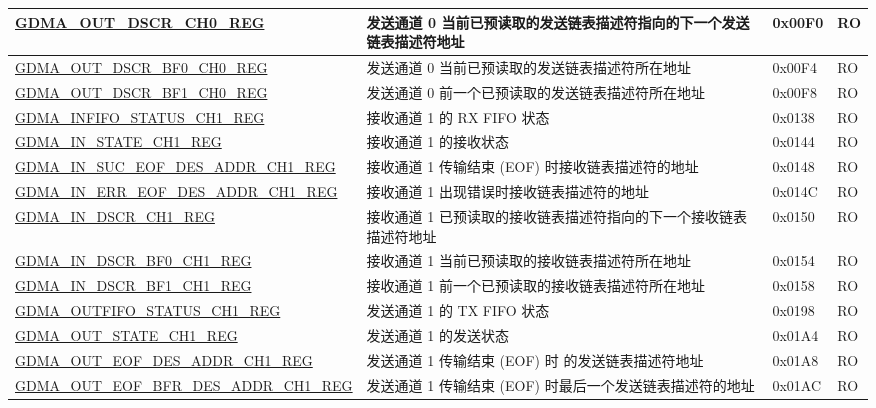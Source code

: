 \begin{longtable}{ | p{6cm} | p{7.2cm} | p{1.3cm} | p{1cm} | }
\hyperref[regdesc:GDMAOUTDSCRCHNREG]{GDMA\_OUT\_DSCR\_CH0\_REG} & 发送通道 0 当前已预读取的发送链表描述符指向的下一个发送链表描述符地址 & 0x00F0 & RO \\ \hline
\hyperref[regdesc:GDMAOUTDSCRBF0CHNREG]{GDMA\_OUT\_DSCR\_BF0\_CH0\_REG} &  发送通道 0 当前已预读取的发送链表描述符所在地址 & 0x00F4 & RO \\ \hline
\hyperref[regdesc:GDMAOUTDSCRBF1CHNREG]{GDMA\_OUT\_DSCR\_BF1\_CH0\_REG} & 发送通道 0 前一个已预读取的发送链表描述符所在地址 & 0x00F8 & RO \\ \hline
\hyperref[regdesc:GDMAINFIFOSTATUSCHNREG]{GDMA\_INFIFO\_STATUS\_CH1\_REG} & 接收通道 1 的 RX FIFO 状态 & 0x0138 & RO \\ \hline
\hyperref[regdesc:GDMAINSTATECHNREG]{GDMA\_IN\_STATE\_CH1\_REG} & 接收通道 1 的接收状态 & 0x0144 & RO \\ \hline
\hyperref[regdesc:GDMAINSUCEOFDESADDRCHNREG]{GDMA\_IN\_SUC\_EOF\_DES\_ADDR\_CH1\newline\_REG} & 接收通道 1 传输结束 (EOF) 时接收链表描述符的地址 & 0x0148 & RO \\ \hline
\hyperref[regdesc:GDMAINERREOFDESADDRCHNREG]{GDMA\_IN\_ERR\_EOF\_DES\_ADDR\_CH1\newline\_REG} & 接收通道 1 出现错误时接收链表描述符的地址 & 0x014C & RO \\ \hline
\hyperref[regdesc:GDMAINDSCRCHNREG]{GDMA\_IN\_DSCR\_CH1\_REG} & 接收通道 1 已预读取的接收链表描述符指向的下一个接收链表描述符地址 & 0x0150 & RO \\ \hline
\hyperref[regdesc:GDMAINDSCRBF0CHNREG]{GDMA\_IN\_DSCR\_BF0\_CH1\_REG} &  接收通道 1 当前已预读取的接收链表描述符所在地址 & 0x0154 & RO \\ \hline
\hyperref[regdesc:GDMAINDSCRBF1CHNREG]{GDMA\_IN\_DSCR\_BF1\_CH1\_REG} & 接收通道 1 前一个已预读取的接收链表描述符所在地址 & 0x0158 & RO \\ \hline
\hyperref[regdesc:GDMAOUTFIFOSTATUSCHNREG]{GDMA\_OUTFIFO\_STATUS\_CH1\_REG} & 发送通道 1 的 TX FIFO 状态 & 0x0198 & RO \\ \hline
\hyperref[regdesc:GDMAOUTSTATECHNREG]{GDMA\_OUT\_STATE\_CH1\_REG} & 发送通道 1 的发送状态 & 0x01A4 & RO \\ \hline
\hyperref[regdesc:GDMAOUTEOFDESADDRCHNREG]{GDMA\_OUT\_EOF\_DES\_ADDR\_CH1\newline\_REG} & 发送通道 1 传输结束 (EOF) 时 的发送链表描述符地址 & 0x01A8 & RO \\ \hline
\hyperref[regdesc:GDMAOUTEOFBFRDESADDRCHNREG]{GDMA\_OUT\_EOF\_BFR\_DES\_ADDR\_CH1\newline\_REG} & 发送通道 1 传输结束 (EOF) 时最后一个发送链表描述符的地址 & 0x01AC & RO \\ \hline

\end{longtable}
